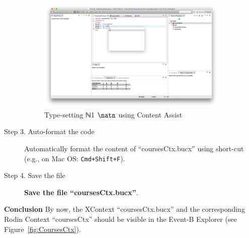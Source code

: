 \begin{description}
\begin{figure}[!htbp]
    \else
    \includegraphics[width=0.9\textwidth]{figures/NAT1ContentAssist}
    \fi
    \caption{Type-setting \ifplastex ℕ1 \else $\natn$ \fi using Content Assist}
    \label{fig:NAT1ContentAssist}
  \end{figure}

\item[Step 3. Auto-format the code] Automatically format the content of ``coursesCtx.bucx'' using short-cut (e.g., on Mac OS: \texttt{Cmd+Shift+F}).

\item[Step 4. Save the file] \textbf{Save the file ``coursesCtx.bucx''}.
\end{description}
\textbf{Conclusion} By now, the XContext ``coursesCtx.bucx'' and the corresponding Rodin Context ``coursesCtx'' should be visible in the Event-B Explorer (see Figure~\ref{fig:CoursesCtx}). 
